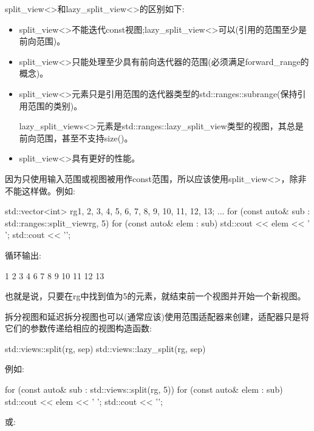 split\_view<>和lazy\_split\_view<>的区别如下:

\begin{itemize}
\item
split\_view<>不能迭代const视图;lazy\_split\_view<>可以(引用的范围至少是前向范围)。

\item
split\_view<>只能处理至少具有前向迭代器的范围(必须满足forward\_range的概念)。

\item
split\_view<>元素只是引用范围的迭代器类型的std::ranges::subrange(保持引用范围的类别)。

lazy\_split\_views<>元素是std::ranges::lazy\_split\_view类型的视图，其总是前向范围，甚至不支持size()。

\item
split\_view<>具有更好的性能。
\end{itemize}

因为只使用输入范围或视图被用作const范围，所以应该使用split\_view<>，除非不能这样做。例如:

\begin{cpp}
std::vector<int> rg{1, 2, 3, 4, 5, 6, 7, 8, 9, 10, 11, 12, 13};
...
for (const auto& sub : std::ranges::split_view{rg, 5}) {
	for (const auto& elem : sub) {
		std::cout << elem << ' ';
	}
	std::cout << '\n';
}
\end{cpp}

循环输出:

\begin{shell}
1 2 3 4
6 7 8 9 10 11 12 13
\end{shell}

也就是说，只要在rg中找到值为5的元素，就结束前一个视图并开始一个新视图。


拆分视图和延迟拆分视图也可以(通常应该)使用范围适配器来创建，适配器只是将它们的参数传递给相应的视图构造函数:

\begin{cpp}
std::views::split(rg, sep)
std::views::lazy_split(rg, sep)
\end{cpp}

例如:

\begin{cpp}
for (const auto& sub : std::views::split(rg, 5)) {
	for (const auto& elem : sub) {
		std::cout << elem << ' ';
	}
	std::cout << '\n';
}
\end{cpp}

或:

